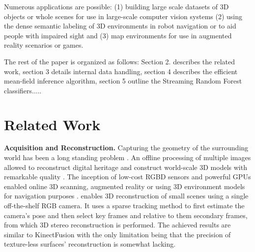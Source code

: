 \documentclass{llncs}
\begin{document}
  Numerous applications are possible: (1) building large scale datasets of 3D objects or whole scenes for use in large-scale computer vision systems (2) using the dense semantic labeling of 3D environments in robot navigation or to aid people with impaired sight and (3) map environments for use in augmented reality scenarios or games. 
  
  The rest of the paper is organized as follows: Section 2. describes the related work, section 3 details internal data handling, section 4 describes the efficient mean-field inference algorithm, section 5 outline the Streaming Random Forest classifiers.....


\section{Related Work}

  \textbf{Acquisition and Reconstruction.} Capturing the geometry of the surrounding world has been a long standing problem \cite{old}. An offline processing of multiple images allowed to reconstruct digital heritage and construct world-scale 3D models with remarkable quality \cite{heritage}. The inception of low-cost RGBD sensors and powerful GPUs enabled online 3D scanning, augmented reality or using 3D environment models for navigation purposes \cite{fusion}. \cite{Monofusion} enables 3D reconstruction of small scenes using a single off-the-shelf RGB camera. It uses a sparse tracking method to first estimate the camera's pose and then select key frames and relative to them secondary frames, from which 3D stereo reconstruction is performed. The achieved results are similar to KinectFusion with the only limitation being that the precision of texture-less surfaces' reconstruction is somewhat lacking. 
  
\end{document}
